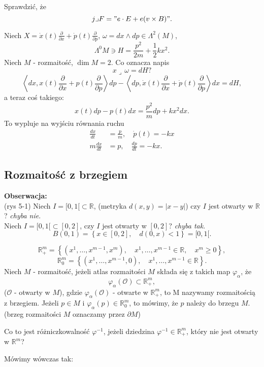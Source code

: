 \documentclass[../main.tex]{subfiles}
\begin{document}
    Sprawdzić, że
    \[
        j \lrcorner F = "e\cdot E + e(v\times B)"
    .\]
\begin{przyklad}
    Niech $X = \dot{x}(t)\frac{\partial }{\partial x} + \dot{p}(t)\frac{\partial }{\partial p} $, $\omega = dx\land dp \in \Lambda^2(M)$,
     \[
         \Lambda^0M \ni H = \frac{p^2}{2m} + \frac{1}{2}kx^2
    .\]
Niech $M$ - rozmaitość, $\dim M = 2$. Co oznacza napis
\[
x\lrcorner\, \omega = dH?
\]
\[
    \left<dx, x(t)\frac{\partial }{\partial x} + p(t)\frac{\partial }{\partial p} \right>dp - \left<dp, \dot{x}(t)\frac{\partial }{\partial x} + \dot{p}(t)\frac{\partial }{\partial p}  \right>dx = dH
,\]
a teraz coś takiego:
\[
    x(t)dp - p(t)dx = \frac{p^2}{m}dp + kx^2dx
.\]
To wypluje na wyjściu równania ruchu
\begin{align*}
    \frac{dx}{dt} &= \frac{p}{m},\quad \dot{p}(t) = -kx\\
    m \frac{dx}{dt} &= p, \quad \frac{dp}{dt} = -kx
.\end{align*}
\end{przyklad}
\subsection{Rozmaitość z brzegiem}
\textbf{Obserwacja:}\\
(rys 5-1)
Niech $I = [0,1[\subset\mathbb{R}$, (metryka $d(x,y) = |x-y|$) czy $I$ jest otwarty w $\mathbb{R}$? \textit{chyba nie}.\\
Niech $I = [0,1[\subset[0,2]$, czy $I$ jest otwarty w $[0,2]$? \textit{chyba tak}.
\[
    B(0,1) = \left\{ x\in [0,2],\quad d(0,x) < 1 \right\} = [0,1[
.\]

\begin{definicja}
    \[
        \mathbb{R}^m_+ = \left\{ (x^1,\ldots,x^{m-1},x^m),\quad x^1,\ldots,x^{m-1}\in\mathbb{R},\quad x^m \ge 0 \right\}
    ,\]
\[
    \mathbb{R}^m_0 = \left\{ (x^1,\ldots,x^{m-1}, 0),\quad x^1,\ldots,x^{m-1}\in\mathbb{R} \right\}
.\]
    Niech $M$ - rozmaitość, jeżeli atlas rozmaitości $M$ składa się z takich map $\varphi_\alpha$, że \[
        \varphi_\alpha(\mathcal{O})\subset\mathbb{R}^m_+
    ,\]
($\mathcal{O}$ - otwarty w $M$), gdzie $\varphi_\alpha(\mathcal{O})$ - otwarte w $\mathbb{R}^m_+$, to M nazywamy rozmaitością z brzegiem. Jeżeli $p\in M$ i $\varphi_\alpha(p)\in \mathbb{R}^m_0$, to mówimy, że $p$ należy do brzegu $M$.\\
    (brzeg rozmaitości $M$ oznaczamy przez $\partial M$)
\end{definicja}
\begin{pytanie}
    Co to jest różniczkowalność $\varphi^{-1}$, jeżeli dziedzina $\varphi^{-1}\in \mathbb{R}^m_+$, który nie jest otwarty w $\mathbb{R}^m$?
\end{pytanie}
Mówimy wówczas tak:
\end{document}
